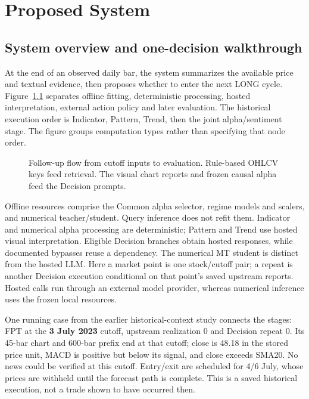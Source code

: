 \chapter{Proposed System}\label{s:9cf7f167cee0404f}
\section{System overview and one-decision walkthrough}\label{s:d04d6247a77e8f69}
At the end of an observed daily bar, the system summarizes the available
price and textual evidence, then proposes whether to enter the next LONG
cycle. Figure~\ref{fig:F03} separates offline fitting, deterministic
processing, hosted interpretation, external action policy and later
evaluation. The historical execution order is Indicator, Pattern, Trend,
then the joint alpha/sentiment stage. The figure groups computation types
rather than specifying that node order.

\begin{figure}[!htb]\centering

\caption[System information and action flow]{Follow-up flow from cutoff inputs to evaluation. Rule-based OHLCV keys feed retrieval. The visual chart reports and frozen causal alpha feed the Decision prompts.}\label{fig:F03}
\end{figure}

Offline resources comprise the Common alpha selector, regime models and
scalers, and numerical teacher/student. Query inference does not refit
them. Indicator and numerical alpha processing are deterministic;
Pattern and Trend use hosted visual interpretation. Eligible Decision
branches obtain hosted responses, while documented bypasses reuse a
dependency. The numerical MT student is distinct from the hosted LLM.
Here a market point is one stock/cutoff pair; a repeat is another Decision
execution conditional on that point's saved upstream reports. Hosted calls
run through an external model provider, whereas numerical inference uses
the frozen local resources.

One running case from the earlier historical-context study connects the stages: FPT at the \textbf{3 July 2023}
cutoff, upstream realization 0 and Decision repeat 0. Its 45-bar chart
and 600-bar prefix end at that cutoff; close is 48.18 in the stored price
unit, MACD is positive but below its signal, and close exceeds SMA20.
No news could be verified at this cutoff. Entry/exit are scheduled for 4/6 July,
whose prices are withheld until the forecast path is complete. This is
a saved historical execution, not a trade shown to have occurred then.

